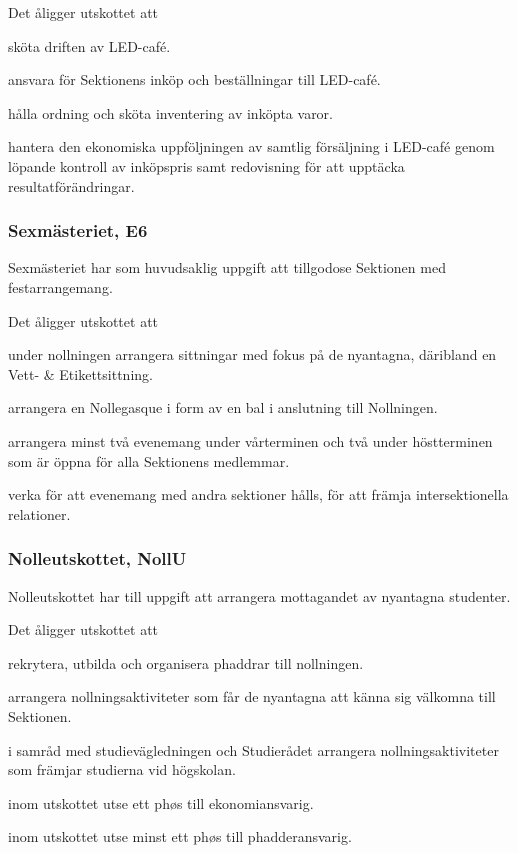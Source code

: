 \documentclass[10pt]{article}
\begin{document}
Det åligger utskottet att
\begin{tightdashlist}
\item sköta driften av LED-café.
\item ansvara för Sektionens inköp och beställningar till LED-café.
\item hålla ordning och sköta inventering av inköpta varor.
\item hantera den ekonomiska uppföljningen av samtlig försäljning i LED-café genom löpande kontroll av inköpspris samt redovisning för att upptäcka resultatförändringar.
\end{tightdashlist}

\subsubsection{Sexmästeriet, E6}
Sexmästeriet har som huvudsaklig uppgift att tillgodose Sektionen med festarrangemang.

Det åligger utskottet att
\begin{tightdashlist}
\item under nollningen arrangera sittningar med fokus på de nyantagna, däribland en Vett- \& Etikettsittning.
\item arrangera en Nollegasque i form av en bal i anslutning till Nollningen.
\item arrangera minst två evenemang under vårterminen och två under höstterminen som är öppna för alla Sektionens medlemmar.
\item verka för att evenemang med andra sektioner hålls, för att främja intersektionella relationer.
\end{tightdashlist}

\subsubsection{Nolleutskottet, NollU}
Nolleutskottet har till uppgift att arrangera mottagandet av nyantagna studenter.

Det åligger utskottet att
\begin{tightdashlist}
    \item rekrytera, utbilda och organisera phaddrar till nollningen.
    \item arrangera nollningsaktiviteter som får de nyantagna att känna sig välkomna till Sektionen.
    \item i samråd med studievägledningen och Studierådet arrangera nollningsaktiviteter som främjar studierna vid högskolan.
    \item inom utskottet utse ett phøs till ekonomiansvarig.
    \item inom utskottet utse minst ett phøs till phadderansvarig.
\end{tightdashlist}
\end{document}
